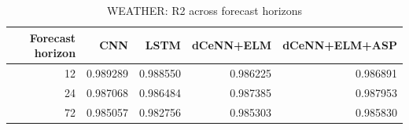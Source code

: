 \begin{table}
\caption{WEATHER: R2 across forecast horizons}
\begin{tabular}{rrrrr}
\toprule
Forecast horizon & CNN & LSTM & dCeNN+ELM & dCeNN+ELM+ASP \\
\midrule
12 & 0.989289 & 0.988550 & 0.986225 & 0.986891 \\
24 & 0.987068 & 0.986484 & 0.987385 & 0.987953 \\
72 & 0.985057 & 0.982756 & 0.985303 & 0.985830 \\
\bottomrule
\end{tabular}
\end{table}
